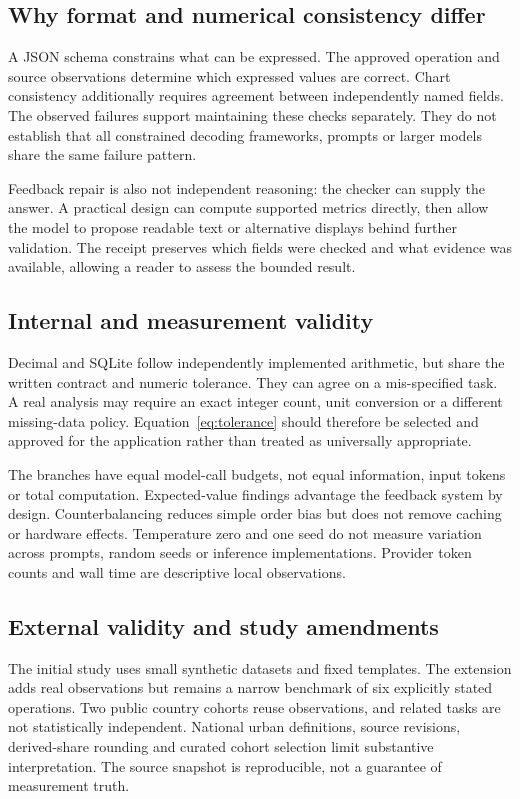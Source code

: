 \subsection{Why format and numerical consistency differ}
A JSON schema constrains what can be expressed. The approved operation and source observations determine which expressed values are correct. Chart consistency additionally requires agreement between independently named fields. The observed failures support maintaining these checks separately. They do not establish that all constrained decoding frameworks, prompts or larger models share the same failure pattern.

Feedback repair is also not independent reasoning: the checker can supply the answer. A practical design can compute supported metrics directly, then allow the model to propose readable text or alternative displays behind further validation. The receipt preserves which fields were checked and what evidence was available, allowing a reader to assess the bounded result.

\subsection{Internal and measurement validity}
Decimal and SQLite follow independently implemented arithmetic, but share the written contract and numeric tolerance. They can agree on a mis-specified task. A real analysis may require an exact integer count, unit conversion or a different missing-data policy. Equation~\ref{eq:tolerance} should therefore be selected and approved for the application rather than treated as universally appropriate.

The branches have equal model-call budgets, not equal information, input tokens or total computation. Expected-value findings advantage the feedback system by design. Counterbalancing reduces simple order bias but does not remove caching or hardware effects. Temperature zero and one seed do not measure variation across prompts, random seeds or inference implementations. Provider token counts and wall time are descriptive local observations.

\subsection{External validity and study amendments}
The initial study uses small synthetic datasets and fixed templates. The extension adds real observations but remains a narrow benchmark of six explicitly stated operations. Two public country cohorts reuse observations, and related tasks are not statistically independent. National urban definitions, source revisions, derived-share rounding and curated cohort selection limit substantive interpretation. The source snapshot is reproducible, not a guarantee of measurement truth.

